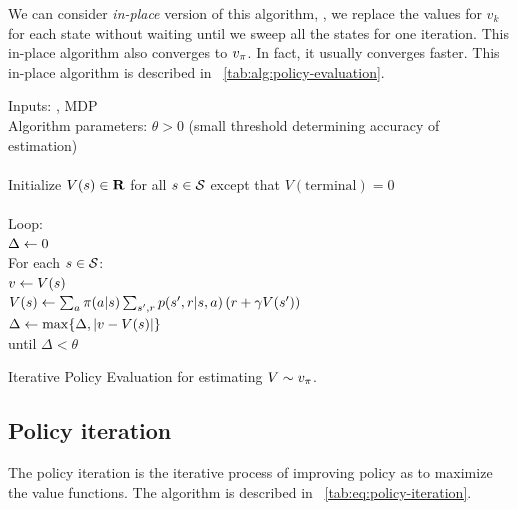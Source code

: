 We can consider \emph{in-place} version of this algorithm,
\ie, we replace the values for $v_k$ for each state without waiting until we sweep all the states for one iteration.
This in-place algorithm also converges to $v_{\pi}$.
In fact, it usually converges faster.
This in-place algorithm is described in \tablename~\ref{tab:alg:policy-evaluation}.


\begin{table}
\beginalg
Inputs: \pol, MDP \\
Algorithm parameters: $\theta > 0$ (small threshold determining accuracy of estimation)\\
\\
Initialize $V(s) \in \mathbf{R}$ for all $s \in \mathcal{S}$ except that $V(\mathrm{terminal}) = 0$ \\
\\
 Loop: \\
 \> $\Delta \leftarrow 0$ \\
 \> For each $s\in\mathcal{S}$: \\
 \> \> $v\leftarrow V(s)$ \\
 \> \> $V(s) \leftarrow \sum_a \pi(a|s) \sum_{{s'}, r} p({s'}, r|s,a) \left( r + \gamma V({s'}) \right)$ \\
 \> \> $\Delta \leftarrow \max\{\Delta, |v-V(s)|\}$ \\
 until $\Delta < \theta$
\endalg
\caption{Iterative Policy Evaluation for estimating $V \sim v_{\pi}$.}
\label{tab:alg:policy-evaluation}
\end{table}


\subsection{Policy iteration}

The policy iteration is the iterative process of improving policy as to maximize the value functions.
The algorithm is described in \tablename~\ref{tab:eq:policy-iteration}.

